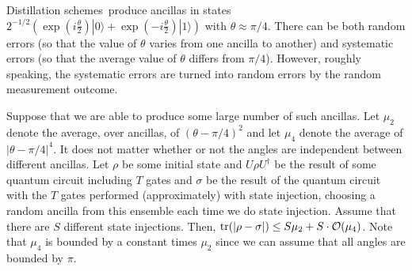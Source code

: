 \documentclass[aps,prl,amsmath,amssymb,amsfonts,superscriptaddress,floatfix]{revtex4}
\newcommand{\tr}{{\rm tr}}
\newcommand{\cO}{{\cal O}}
\begin{document}
Distillation schemes\ produce ancillas in states $2^{-1/2} (\exp(i\frac{\theta}{2}) |0\rangle+\exp(-i \frac{\theta}{2}) |1\rangle)$ with $\theta\approx \pi/4$.  
There can be both random errors (so that the value of $\theta$ varies from one ancilla to another) and
systematic errors (so that the
average value of $\theta$ differs from $\pi/4$).  However, roughly speaking, the systematic errors are turned into random
errors by the random measurement outcome.

Suppose that we are able to produce some large number of such ancillas.  Let $\mu_2$ denote the average, over
ancillas, of $(\theta-\pi/4)^2$ and let $\mu_4$ denote the average of $|\theta-\pi/4|^4$.  It does not matter whether or not the angles are independent between different ancillas.  Let $\rho$ be some initial state and $U\rho U^\dagger$ be the result of some quantum circuit including $T$ gates and $\sigma$ be the result of the quantum circuit with the $T$ gates performed (approximately) with state injection, choosing a random ancilla from this ensemble each time we do state injection.  Assume that there
are $S$ different state injections.  Then, $\tr(|\rho-\sigma|) \leq S \mu_2+S \cdot \cO(\mu_4)$.
Note that $\mu_4$ is bounded by a constant times $\mu_2$ since we can assume that all angles are bounded by $\pi$.
\end{document}
